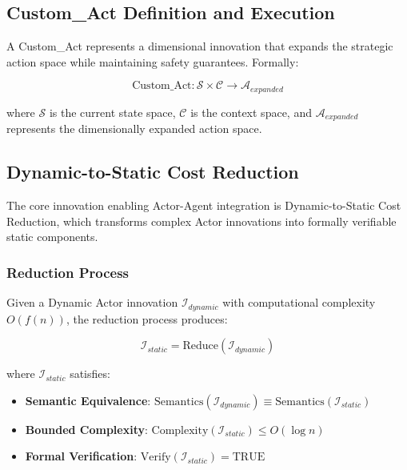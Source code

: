 \documentclass[12pt,a4paper]{article}
\begin{document}
\subsection{Custom\_Act Definition and Execution}

A Custom\_Act represents a dimensional innovation that expands the strategic action space while maintaining safety guarantees. Formally:

\begin{equation}
\text{Custom\_Act}: \mathcal{S} \times \mathcal{C} \rightarrow \mathcal{A}_{expanded}
\end{equation}

where $\mathcal{S}$ is the current state space, $\mathcal{C}$ is the context space, and $\mathcal{A}_{expanded}$ represents the dimensionally expanded action space.

\subsection{Dynamic-to-Static Cost Reduction}

The core innovation enabling Actor-Agent integration is Dynamic-to-Static Cost Reduction, which transforms complex Actor innovations into formally verifiable static components.

\subsubsection{Reduction Process}

Given a Dynamic Actor innovation $\mathcal{I}_{dynamic}$ with computational complexity $O(f(n))$, the reduction process produces:

\begin{equation}
\mathcal{I}_{static} = \text{Reduce}(\mathcal{I}_{dynamic})
\end{equation}

where $\mathcal{I}_{static}$ satisfies:

\begin{itemize}
    \item \textbf{Semantic Equivalence}: $\text{Semantics}(\mathcal{I}_{dynamic}) \equiv \text{Semantics}(\mathcal{I}_{static})$
    \item \textbf{Bounded Complexity}: $\text{Complexity}(\mathcal{I}_{static}) \leq O(\log n)$
    \item \textbf{Formal Verification}: $\text{Verify}(\mathcal{I}_{static}) = \text{TRUE}$
\end{itemize}
\end{document}
